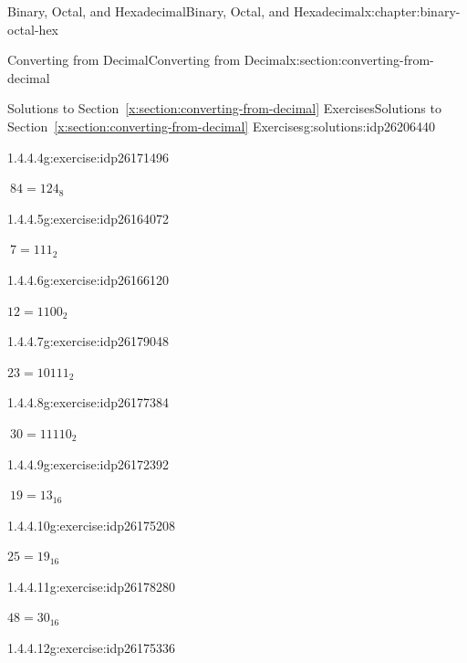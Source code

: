 \documentclass[twoside,10pt,]{book}
\newcommand{\xreffont}{\relax}
\numberwithin{equation}{section}
\begin{document}
\begin{chapterptx}{Binary, Octal, and Hexadecimal}{}{Binary, Octal, and Hexadecimal}{}{}{x:chapter:binary-octal-hex}
\begin{sectionptx}{Converting from Decimal}{}{Converting from Decimal}{}{}{x:section:converting-from-decimal}
\begin{solutions-subsection}{Solutions to Section~{\xreffont\ref*{x:section:converting-from-decimal}} Exercises}{}{Solutions to Section~{\xreffont\ref*{x:section:converting-from-decimal}} Exercises}{}{}{g:solutions:idp26206440}
\begin{exercisegroup}
\begin{divisionsolutioneg}{1.4.4.4}{}{g:exercise:idp26171496}
\par\smallskip%
\noindent\hypertarget{g:solution:idp26163688-main}{}\(\ 84=124_8\)\end{divisionsolutioneg}%
\end{exercisegroup}
\par\medskip\noindent
\begin{exercisegroup}
\begin{divisionsolutioneg}{1.4.4.5}{}{g:exercise:idp26164072}%
\par\smallskip%
\noindent\hypertarget{g:solution:idp26164968-main}{}\(\ 7=111_2\)\end{divisionsolutioneg}%
\begin{divisionsolutioneg}{1.4.4.6}{}{g:exercise:idp26166120}%
\par\smallskip%
\noindent\hypertarget{g:solution:idp26173928-main}{}\(12=1100_2\)\end{divisionsolutioneg}%
\begin{divisionsolutioneg}{1.4.4.7}{}{g:exercise:idp26179048}%
\par\smallskip%
\noindent\hypertarget{g:solution:idp26176488-main}{}\(23=10111_2\)\end{divisionsolutioneg}%
\begin{divisionsolutioneg}{1.4.4.8}{}{g:exercise:idp26177384}%
\par\smallskip%
\noindent\hypertarget{g:solution:idp26173672-main}{}\(\ 30=11110_2\)\end{divisionsolutioneg}%
\end{exercisegroup}
\par\medskip\noindent
\begin{exercisegroup}
\begin{divisionsolutioneg}{1.4.4.9}{}{g:exercise:idp26172392}%
\par\smallskip%
\noindent\hypertarget{g:solution:idp26174056-main}{}\(\ 19=13_{16}\)\end{divisionsolutioneg}%
\begin{divisionsolutioneg}{1.4.4.10}{}{g:exercise:idp26175208}%
\par\smallskip%
\noindent\hypertarget{g:solution:idp26177640-main}{}\(25=19_{16}\)\end{divisionsolutioneg}%
\begin{divisionsolutioneg}{1.4.4.11}{}{g:exercise:idp26178280}%
\par\smallskip%
\noindent\hypertarget{g:solution:idp26176616-main}{}\(48=30_{16}\)\end{divisionsolutioneg}%
\begin{divisionsolutioneg}{1.4.4.12}{}{g:exercise:idp26175336}%

\end{divisionsolutioneg}
\end{exercisegroup}
\end{solutions-subsection}
\end{sectionptx}
\end{chapterptx}
\end{document}
